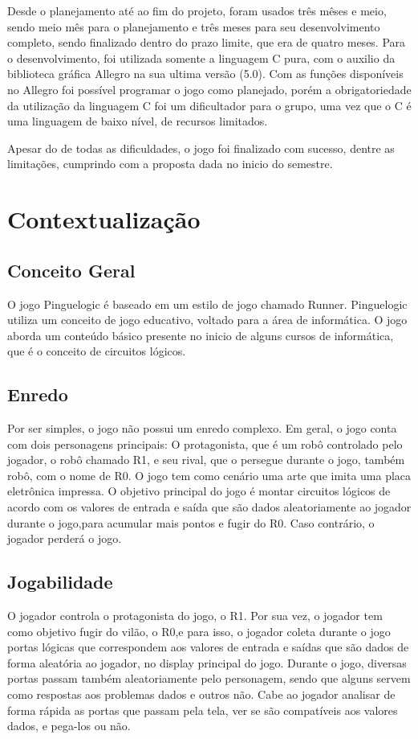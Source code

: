 \documentclass[fncyhd,a4paper]{article}
\begin{document}
	\large Desde o planejamento até ao fim do projeto, foram usados três mêses e meio, sendo meio mês para o planejamento e três meses para seu desenvolvimento completo, sendo finalizado dentro 
	do prazo limite, que era de quatro meses. Para o desenvolvimento, foi utilizada somente a linguagem C pura, com o auxilio da biblioteca gráfica Allegro na sua ultima versão (5.0). Com as funções disponíveis
	no  Allegro foi possível programar o jogo como planejado, porém a obrigatoriedade da utilização da linguagem C  foi um dificultador para o grupo, uma vez que o C é uma linguagem de baixo nível,
	de recursos limitados.
	
	\large Apesar do de todas as dificuldades, o jogo foi finalizado com sucesso, dentre as limitações, cumprindo com a proposta dada no inicio do semestre.
	
	
	
	
	\section{\Large Contextualização}
	\subsection{\large Conceito Geral}
	\large O jogo Pinguelogic é baseado em um estilo de jogo chamado Runner. Pinguelogic utiliza um conceito de jogo educativo, voltado para a área de informática. O jogo aborda
	um conteúdo básico presente no inicio de alguns cursos de informática, que é o conceito de circuitos lógicos.

	
	\subsection{\large Enredo}
	\large Por ser simples, o jogo não possui um enredo complexo. Em geral, o jogo conta com dois personagens principais: O protagonista, que é um robô controlado pelo jogador, 
	o robô chamado R1, e seu rival, que o persegue durante o jogo, também robô, com o nome de R0. O jogo tem como cenário uma arte que imita uma placa eletrônica impressa. 
	O objetivo principal do jogo é montar circuitos lógicos de acordo com os valores de entrada e saída que são dados aleatoriamente ao jogador durante o jogo,para acumular mais
	pontos e fugir do R0. Caso contrário, o jogador perderá o jogo.
	

	\subsection{\large Jogabilidade}
	\large O jogador controla o protagonista do jogo, o R1. Por sua vez, o jogador tem como objetivo fugir do vilão, o R0,e para isso, o jogador coleta durante o jogo
	portas lógicas que correspondem aos valores de entrada e saídas que são dados de forma aleatória ao jogador, no display principal do jogo. Durante o jogo, diversas portas
	passam também aleatoriamente pelo personagem, sendo que alguns servem como respostas aos problemas dados e outros não. Cabe ao jogador analisar de forma rápida as portas 
	que passam pela tela, ver se são compatíveis aos valores dados, e pega-los ou não. 
	
\end{document}
